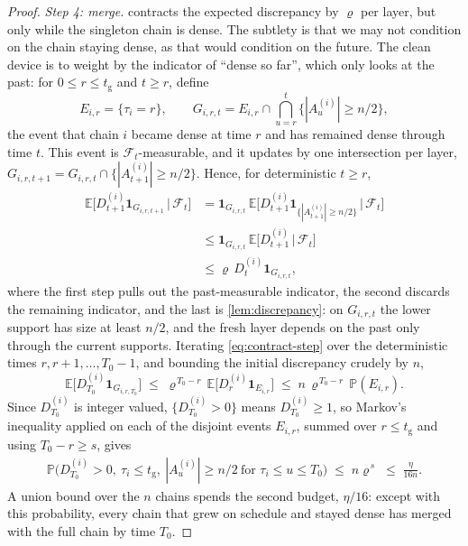 \documentclass[
    aps,
    superscriptaddress,
    onecolumn,
    10pt,
    prx,
    nofootinbib
]{revtex4-2}
\theoremstyle{namedstatement}
\theoremstyle{plain}
\begin{document}
\begin{proof}
\medskip\noindent\emph{Step 4: merge.}
 contracts the expected discrepancy by $\varrho$ per layer, but only while the singleton chain is dense. The subtlety is that we may not condition on the chain staying dense, as that would condition on the future. The clean device is to weight by the indicator of ``dense so far'', which only looks at the past: for $0\le r\le t_{\mathrm g}$ and $t\ge r$, define
\begin{equation}
  E_{i,r}=\{\tau_i=r\},
  \qquad
  G_{i,r,t}=E_{i,r}\cap\bigcap_{u=r}^{t}\{|A_u^{(i)}|\ge n/2\},
\end{equation}
the event that chain $i$ became dense at time $r$ and has remained dense through time $t$. This event is $\mathcal F_t$-measurable, and it updates by one intersection per layer, $G_{i,r,t+1}=G_{i,r,t}\cap\{|A_{t+1}^{(i)}|\ge n/2\}$. Hence, for deterministic $t\ge r$,
\begin{align}
  \mathbb E\big[D_{t+1}^{(i)}\mathbf 1_{G_{i,r,t+1}}\,\big|\,\mathcal F_t\big]
  &=\mathbf 1_{G_{i,r,t}}\,
    \mathbb E\big[D_{t+1}^{(i)}\mathbf 1_{\{|A_{t+1}^{(i)}|\ge n/2\}}\,\big|\,\mathcal F_t\big]\\
  &\le\mathbf 1_{G_{i,r,t}}\,
    \mathbb E\big[D_{t+1}^{(i)}\,\big|\,\mathcal F_t\big]\\
  &\le\varrho\,D_t^{(i)}\mathbf 1_{G_{i,r,t}},\label{eq:contract-step}
\end{align}
where the first step pulls out the past-measurable indicator, the second discards the remaining indicator, and the last is \cref{lem:discrepancy}: on $G_{i,r,t}$ the lower support has size at least $n/2$, and the fresh layer depends on the past only through the current supports. Iterating \cref{eq:contract-step} over the deterministic times $r,r+1,\dots,T_0-1$, and bounding the initial discrepancy crudely by $n$,
\begin{equation}\label{eq:contract-iter}
  \mathbb E\big[D_{T_0}^{(i)}\mathbf 1_{G_{i,r,T_0}}\big]
  \;\le\;\varrho^{\,T_0-r}\,\mathbb E\big[D_r^{(i)}\mathbf 1_{E_{i,r}}\big]
  \;\le\;n\,\varrho^{\,T_0-r}\,\mathbb P(E_{i,r}).
\end{equation}
Since $D_{T_0}^{(i)}$ is integer valued, $\{D_{T_0}^{(i)}>0\}$ means $D_{T_0}^{(i)}\ge1$, so Markov's inequality applied on each of the disjoint events $E_{i,r}$, summed over $r\le t_{\mathrm g}$ and using $T_0-r\ge s$, gives
\begin{align}
  \mathbb P\big(D_{T_0}^{(i)}>0,\ \tau_i\le t_{\mathrm g},\
  |A_u^{(i)}|\ge n/2\ \text{for }\tau_i\le u\le T_0\big)
  \;\le\;n\varrho^{\,s}\;\le\;\frac\eta{16n}.\label{eq:contract-fail}
\end{align}
A union bound over the $n$ chains spends the second budget, $\eta/16$: except with this probability, every chain that grew on schedule and stayed dense has merged with the full chain by time $T_0$.
 

\end{proof}
\end{document}
